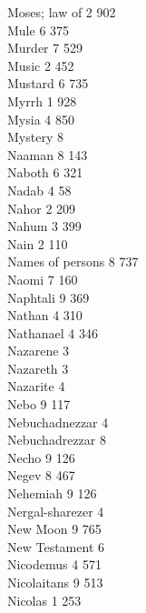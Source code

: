 Moses; law of \hfill 2 \quad \phantom{0}902\\
Mule \hfill 6 \quad \phantom{0}375\\
Murder \hfill 7 \quad \phantom{0}529\\
Music \hfill 2 \quad \phantom{0}452\\
Mustard \hfill 6 \quad \phantom{0}735\\
Myrrh \hfill 1 \quad \phantom{0}928\\
Mysia \hfill 4 \quad \phantom{0}850\\
Mystery \hfill 8 \\
Naaman \hfill 8 \quad \phantom{0}143\\
Naboth \hfill 6 \quad \phantom{0}321\\
Nadab \hfill 4 \quad \phantom{0}\phantom{0}58\\
Nahor \hfill 2 \quad \phantom{0}209\\
Nahum \hfill 3 \quad \phantom{0}399\\
Nain \hfill 2 \quad \phantom{0}110\\
Names of persons \hfill 8 \quad \phantom{0}737\\
Naomi \hfill 7 \quad \phantom{0}160\\
Naphtali \hfill 9 \quad \phantom{0}369\\
Nathan \hfill 4 \quad \phantom{0}310\\
Nathanael \hfill 4 \quad \phantom{0}346\\
Nazarene \hfill 3 \\
Nazareth \hfill 3 \\
Nazarite \hfill 4 \\
Nebo \hfill 9 \quad \phantom{0}117\\
Nebuchadnezzar \hfill 4 \\
Nebuchadrezzar \hfill 8 \\
Necho \hfill 9 \quad \phantom{0}126\\
Negev \hfill 8 \quad \phantom{0}467\\
Nehemiah \hfill 9 \quad \phantom{0}126\\
Nergal-sharezer \hfill 4 \\
New Moon \hfill 9 \quad \phantom{0}765\\
New Testament \hfill 6 \\
Nicodemus \hfill 4 \quad \phantom{0}571\\
Nicolaitans \hfill 9 \quad \phantom{0}513\\
Nicolas \hfill 1 \quad \phantom{0}253\\
